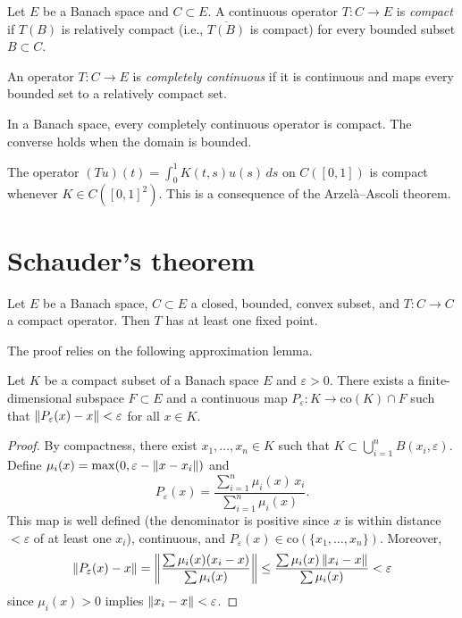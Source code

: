 \begin{definition}
Let $E$ be a Banach space and $C \subset E$. A continuous operator $T : C \to E$
is \emph{compact} if $T(B)$ is relatively compact (i.e., $\overline{T(B)}$ is
compact) for every bounded subset $B \subset C$.
\end{definition}

\begin{definition}
An operator $T : C \to E$ is \emph{completely continuous} if it is continuous and
maps every bounded set to a relatively compact set.
\end{definition}

\begin{remark}
In a Banach space, every completely continuous operator is compact. The converse
holds when the domain is bounded.
\end{remark}

\begin{example}
The operator $(Tu)(t) = \int_0^1 K(t,s) u(s) \, ds$ on $C([0,1])$ is compact
whenever $K \in C([0,1]^2)$. This is a consequence of the Arzel\`a--Ascoli theorem.
\end{example}

\section{Schauder's theorem}

\begin{theorem}[Schauder, 1930]\label{thm:schauder}
Let $E$ be a Banach space, $C \subset E$ a closed, bounded, convex subset, and
$T : C \to C$ a compact operator. Then $T$ has at least one fixed point.
\end{theorem}

The proof relies on the following approximation lemma.

\begin{lemma}\label{lem:schauder-approx}
Let $K$ be a compact subset of a Banach space $E$ and $\varepsilon > 0$. There
exists a finite-dimensional subspace $F \subset E$ and a continuous map
$P_\varepsilon : K \to \mathrm{co}(K) \cap F$ such that
$\left\| P_\varepsilon(x) - x \right\| < \varepsilon$ for all $x \in K$.
\end{lemma}

\begin{proof}
By compactness, there exist $x_1, \ldots, x_n \in K$ such that
$K \subset \bigcup_{i=1}^n B(x_i, \varepsilon)$. Define
$\mu_i(x) = \max(0, \varepsilon - \left\| x - x_i \right\|)$ and
\[
    P_\varepsilon(x) = \frac{\sum_{i=1}^n \mu_i(x) \, x_i}{\sum_{i=1}^n \mu_i(x)}.
\]
This map is well defined (the denominator is positive since $x$ is within
distance $< \varepsilon$ of at least one $x_i$), continuous, and
$P_\varepsilon(x) \in \mathrm{co}(\{x_1, \ldots, x_n\})$. Moreover,
\[
    \left\| P_\varepsilon(x) - x \right\| = \left\| \frac{\sum \mu_i(x)(x_i - x)}{\sum \mu_i(x)} \right\|
    \leq \frac{\sum \mu_i(x) \left\| x_i - x \right\|}{\sum \mu_i(x)} < \varepsilon
\]
since $\mu_i(x) > 0$ implies $\left\| x_i - x \right\| < \varepsilon$.
\end{proof}

